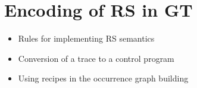 

\section{Encoding of RS in GT}
\begin{itemize}
\item Rules for implementing RS semantics
\item Conversion of a trace to a control program
\item Using recipes in the occurrence graph building
\end{itemize}
